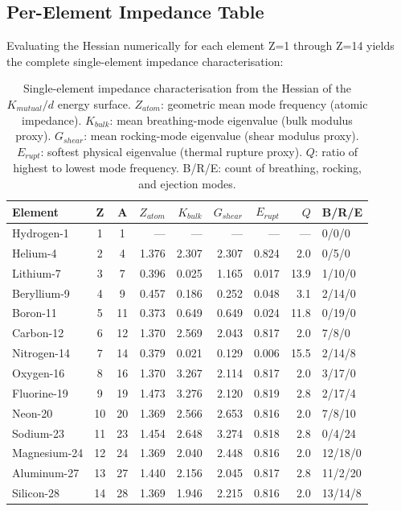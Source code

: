 \subsection{Per-Element Impedance Table}

Evaluating the Hessian numerically for each element Z=1 through Z=14 yields the complete single-element impedance characterisation:

\begin{table}[h!]
    \centering
    \small
    \begin{tabularx}{\textwidth}{@{}l c c r r r r r X@{}}
    \hline\hline
    \textbf{Element} & \textbf{Z} & \textbf{A} & $Z_{atom}$ & $K_{bulk}$ & $G_{shear}$ & $E_{rupt}$ & $Q$ & \textbf{B/R/E} \\
    \hline
    Hydrogen-1  & 1  & 1  & ---    & ---    & ---    & ---    & --- & 0/0/0  \\
    Helium-4    & 2  & 4  & 1.376  & 2.307  & 2.307  & 0.824  & 2.0 & 0/5/0  \\
    Lithium-7   & 3  & 7  & 0.396  & 0.025  & 1.165  & 0.017  & 13.9 & 1/10/0 \\
    Beryllium-9 & 4  & 9  & 0.457  & 0.186  & 0.252  & 0.048  & 3.1 & 2/14/0 \\
    Boron-11    & 5  & 11 & 0.373  & 0.649  & 0.649  & 0.024  & 11.8 & 0/19/0 \\
    Carbon-12   & 6  & 12 & 1.370  & 2.569  & 2.043  & 0.817  & 2.0 & 7/8/0  \\
    Nitrogen-14 & 7  & 14 & 0.379  & 0.021  & 0.129  & 0.006  & 15.5 & 2/14/8 \\
    Oxygen-16   & 8  & 16 & 1.370  & 3.267  & 2.114  & 0.817  & 2.0 & 3/17/0 \\
    Fluorine-19 & 9  & 19 & 1.473  & 3.276  & 2.120  & 0.819  & 2.8 & 2/17/4 \\
    Neon-20     & 10 & 20 & 1.369  & 2.566  & 2.653  & 0.816  & 2.0 & 7/8/10 \\
    Sodium-23   & 11 & 23 & 1.454  & 2.648  & 3.274  & 0.818  & 2.8 & 0/4/24 \\
    Magnesium-24 & 12 & 24 & 1.369 & 2.040  & 2.448  & 0.816  & 2.0 & 12/18/0 \\
    Aluminum-27 & 13 & 27 & 1.440  & 2.156  & 2.045  & 0.817  & 2.8 & 11/2/20 \\
    Silicon-28  & 14 & 28 & 1.369  & 1.946  & 2.215  & 0.816  & 2.0 & 13/14/8 \\
    \hline\hline
    \end{tabularx}
    \caption{Single-element impedance characterisation from the Hessian of the $K_{mutual}/d$ energy surface. $Z_{atom}$: geometric mean mode frequency (atomic impedance). $K_{bulk}$: mean breathing-mode eigenvalue (bulk modulus proxy). $G_{shear}$: mean rocking-mode eigenvalue (shear modulus proxy). $E_{rupt}$: softest physical eigenvalue (thermal rupture proxy). $Q$: ratio of highest to lowest mode frequency. B/R/E: count of breathing, rocking, and ejection modes.}
    \label{tab:element_impedance}
\end{table}

